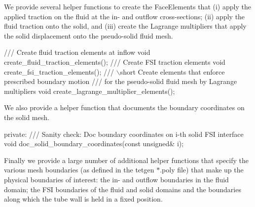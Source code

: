 We provide several helper functions to create the {\ttfamily Face\+Elements} that (i) apply the applied traction on the fluid at the in-\/ and outflow cross-\/sections; (ii) apply the fluid traction onto the solid, and (iii) create the Lagrange multipliers that apply the solid displacement onto the pseudo-\/solid fluid mesh.


\begin{DoxyCodeInclude}
 \textcolor{comment}{}
\textcolor{comment}{ /// Create fluid traction elements at inflow}
\textcolor{comment}{} \textcolor{keywordtype}{void} create\_fluid\_traction\_elements();
\textcolor{comment}{}
\textcolor{comment}{ /// Create FSI traction elements}
\textcolor{comment}{} \textcolor{keywordtype}{void} create\_fsi\_traction\_elements();
\textcolor{comment}{}
\textcolor{comment}{ /// \(\backslash\)short Create elements that enforce prescribed boundary motion}
\textcolor{comment}{ /// for the pseudo-solid fluid mesh by Lagrange multipliers}
\textcolor{comment}{} \textcolor{keywordtype}{void} create\_lagrange\_multiplier\_elements();

\end{DoxyCodeInclude}


We also provide a helper function that documents the boundary coordinates on the solid mesh.


\begin{DoxyCodeInclude}


\textcolor{keyword}{private}:
 \textcolor{comment}{}
\textcolor{comment}{ /// Sanity check: Doc boundary coordinates on i-th solid FSI interface}
\textcolor{comment}{} \textcolor{keywordtype}{void} doc\_solid\_boundary\_coordinates(\textcolor{keyword}{const} \textcolor{keywordtype}{unsigned}& i);

\end{DoxyCodeInclude}


Finally we provide a large number of additional helper functions that specify the various mesh boundaries (as defined in the tetgen {\ttfamily $\ast$.poly} file) that make up the physical boundaries of interest\+: the in-\/ and outflow boundaries in the fluid domain; the F\+SI boundaries of the fluid and solid domains and the boundaries along which the tube wall is held in a fixed position.


